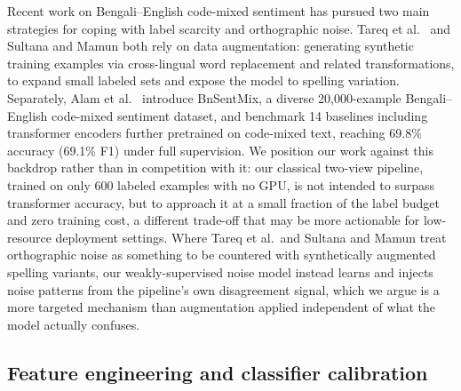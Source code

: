 \documentclass[conference]{IEEEtran}
\begin{document}
Recent work on Bengali--English code-mixed sentiment has pursued two main
strategies for coping with label scarcity and orthographic noise. Tareq et
al.\ \citep{tareq2023augmentation} and Sultana and Mamun
\citep{sultana2024crosslingual} both rely on data augmentation: generating
synthetic training examples via cross-lingual word replacement and related
transformations, to expand small labeled sets and expose the model to spelling
variation. Separately, Alam et al.\ \citep{alam2025bnsentmix}
introduce BnSentMix, a diverse 20{,}000-example Bengali--English code-mixed
sentiment dataset, and benchmark 14 baselines including transformer encoders
further pretrained on code-mixed text, reaching 69.8\% accuracy (69.1\% F1)
under full supervision. We position our work against this backdrop rather than
in competition with it: our classical two-view pipeline, trained on only 600
labeled examples with no GPU, is not intended to surpass transformer accuracy,
but to approach it at a small fraction of the label budget and zero training
cost, a different trade-off that may be more actionable for low-resource
deployment settings. Where Tareq et al.\ and Sultana and Mamun
treat orthographic noise as something to be countered with synthetically
augmented spelling variants, our weakly-supervised noise model instead learns
and injects noise patterns from the pipeline's own disagreement signal, which
we argue is a more targeted mechanism than augmentation applied independent of
what the model actually confuses.

\subsection{Feature engineering and classifier calibration}
\end{document}
